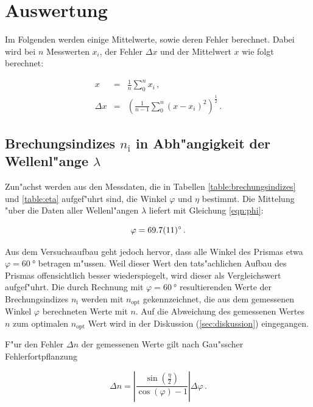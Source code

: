 \section{Auswertung}
\label{sec:auswertung}

	Im Folgenden werden einige Mittelwerte, sowie deren Fehler berechnet.
	Dabei wird bei $n$ Messwerten $x_i$, der Fehler $\Delta x$ und der Mittelwert $x$ wie folgt berechnet:

	\begin{eqnarray*}
		x & = & \frac{1}{n}\sum_0^n{x_i} \,, \\
		\Delta x & = & \left(\frac{1}{n-1} \sum_0^n{(x - x_i)^2}\right)^\frac{1}{2} \,.
	\end{eqnarray*}

	\subsection{Brechungsindizes $n_\mathrm{i}$ in Abh"angigkeit der Wellenl"ange $\lambda$}
	\label{subsec:brechungsindizes}
		Zun"achst werden aus den Messdaten, die in Tabellen \ref{table:brechungsindizes} und \ref{table:eta} aufgef"uhrt sind, die Winkel $\varphi$ und $\eta$ bestimmt.
		Die Mittelung "uber die Daten aller Wellenl"angen $\lambda$ liefert mit Gleichung \eqref{eqn:phi}:

		\begin{equation*}
			\varphi = \SI{69.7 (11)}{\degree} \,.
		\end{equation*}

		Aus dem Versuchsaufbau geht jedoch hervor, dass alle Winkel des Prismas etwa $\varphi = \SI{60}{\degree}$ betragen m"ussen.
		Weil dieser Wert den tats"achlichen Aufbau des Prismas offensichtlich besser wiederspiegelt, wird dieser als Vergleichswert aufgef"uhrt.
		Die durch Rechnung mit $\varphi = \SI{60}{\degree}$ resultierenden Werte der Brechungsindizes $n_\mathrm{i}$ werden mit $n_\mathrm{opt}$ gekennzeichnet, die aus dem gemessenen Winkel $\varphi$ berechneten Werte mit $n$.
		Auf die Abweichung des gemessenen Wertes $n$ zum optimalen $n_\mathrm{opt}$ Wert wird in der Diskussion (\ref{sec:diskussion}) eingegangen.

		F"ur den Fehler $\Delta n$ der gemessenen Werte gilt nach Gau"sscher Fehlerfortpflanzung

		\begin{equation}
			\Delta n = \left|\frac{\sin\left(\frac{\eta}{2}\right)}{\cos(\varphi) - 1}\right| \Delta \varphi \,.
		\end{equation}

